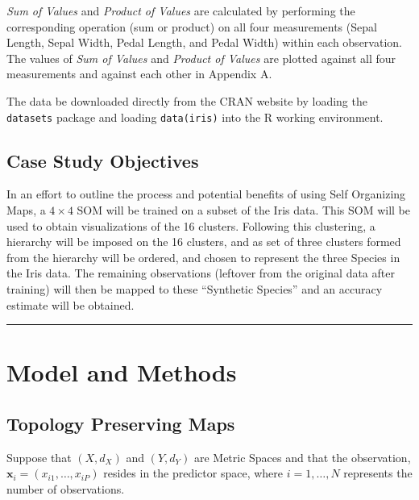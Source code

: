 \documentclass[12pt,]{article}
\begin{document}
\textit{Sum of Values} and \textit{Product of Values} are calculated by
performing the corresponding operation (sum or product) on all four
measurements (Sepal Length, Sepal Width, Pedal Length, and Pedal Width)
within each observation. The values of \textit{Sum of Values} and
\textit{Product of Values} are plotted against all four measurements and
against each other in Appendix A.

The data be downloaded directly from the CRAN website by loading the
\texttt{datasets} package and loading \texttt{data(iris)} into the R
working environment.

\hypertarget{case-study-objectives}{%
\subsection{Case Study Objectives}\label{case-study-objectives}}

In an effort to outline the process and potential benefits of using Self
Organizing Maps, a \(4 \times 4\) SOM will be trained on a subset of the
Iris data. This SOM will be used to obtain visualizations of the 16
clusters. Following this clustering, a hierarchy will be imposed on the
16 clusters, and as set of three clusters formed from the hierarchy will
be ordered, and chosen to represent the three Species in the Iris data.
The remaining observations (leftover from the original data after
training) will then be mapped to these ``Synthetic Species'' and an
accuracy estimate will be obtained.

\begin{center}\rule{0.5\linewidth}{\linethickness}\end{center}

\hypertarget{model-and-methods}{%
\section{Model and Methods}\label{model-and-methods}}

\hypertarget{topology-preserving-maps}{%
\subsection{Topology Preserving Maps}\label{topology-preserving-maps}}

Suppose that \((X, d_{X})\) and \((Y, d_{Y})\) are Metric Spaces and
that the observation,
\newline \(\mathbf{x}_{i} = \left( x_{i1}, \ldots, x_{iP} \right)\)
resides in the predictor space, where \(i = 1, \ldots, N\) represents
the number of observations.
\end{document}
